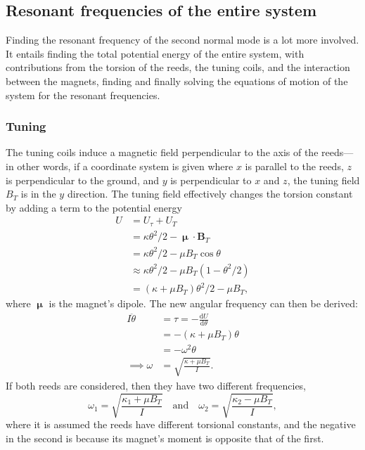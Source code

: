 \documentclass{article}
\begin{document}
\subsection{Resonant frequencies of the entire system}
Finding the resonant frequency of the second normal mode is a lot more involved. It entails finding the total potential energy of the entire system, with contributions from the torsion of the reeds, the tuning coils, and the interaction between the magnets, finding and finally solving the equations of motion of the system for the resonant frequencies.
\subsubsection{Tuning}
The tuning coils induce a magnetic field perpendicular to the axis of the reeds---in other words, if a coordinate system is given where $x$ is parallel to the reeds, $z$ is perpendicular to the ground, and $y$ is perpendicular to $x$ and $z$, the tuning field $B_T$ is in the $y$ direction. The tuning field effectively changes the torsion constant by adding a term to the potential energy
\begin{equation}
    \begin{aligned}
        U   &= U_\tau + U_T \\
            &= \kappa\theta^2/2 - \bm{\upmu}\cdot\mathbf{B}_T \\
            &= \kappa\theta^2/2 - \mu B_T \cos \theta \\
            &\approx \kappa\theta^2/2 - \mu B_T (1-\theta^2/2) \\
            &= (\kappa+\mu B_T)\theta^2/2 - \mu B_T,
    \end{aligned}
\end{equation}
where $\bm{\upmu}$ is the magnet's dipole. The new angular frequency can then be derived:
\begin{equation}
    \begin{aligned}
        I \ddot{\theta} &= \tau = -\frac{\mathrm{d}U}{\mathrm{d}\theta} \\
            &= -(\kappa + \mu B_T)\theta \\
            &= -\omega^2 \theta \\
           \implies \omega &=  \sqrt{\frac{\kappa + \mu B_T}{I}}.
    \end{aligned}
\end{equation}
If both reeds are considered, then they have two different frequencies,
\begin{equation}
    \omega_1 = \sqrt{\frac{\kappa_1 + \mu B_T}{I}}\quad\text{and}\quad\omega_2 = \sqrt{\frac{\kappa_2 - \mu B_T}{I}},
\end{equation}
where it is assumed the reeds have different torsional constants, and the negative in the second is because its magnet's moment is opposite that of the first.
\end{document}
